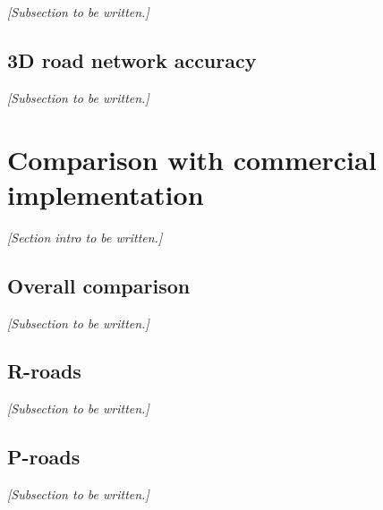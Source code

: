 \textit{[Subsection to be written.]}

\subsection{3D road network accuracy}
\label{sub:accuracynwb}

\textit{[Subsection to be written.]}

\section{Comparison with commercial implementation}
\label{sec:comparison}

\textit{[Section intro to be written.]}

\subsection{Overall comparison}
\label{sub:comparisonoverall}

\textit{[Subsection to be written.]}

\subsection{R-roads}
\label{sub:comparisonrroads}

\textit{[Subsection to be written.]}

\subsection{P-roads}
\label{sub:comparisonproads}

\textit{[Subsection to be written.]}